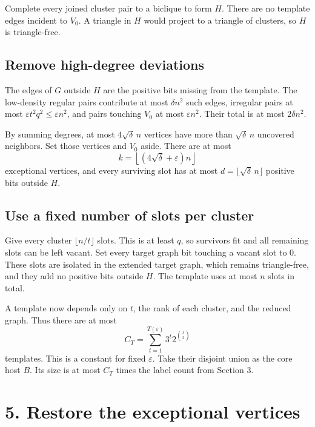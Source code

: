 \documentclass[11pt,a4paper]{article}
\begin{document}
Complete every joined cluster pair to a biclique to form \(H\). There
are no template edges incident to \(V_0\). A triangle in \(H\) would
project to a triangle of clusters, so \(H\) is triangle-free.

\subsection{Remove high-degree
deviations}\label{remove-high-degree-deviations}

The edges of \(G\) outside \(H\) are the positive bits missing from the
template. The low-density regular pairs contribute at most
\(\delta n^2\) such edges, irregular pairs at most
\(\varepsilon t^2q^2\le\varepsilon n^2\), and pairs touching \(V_0\) at
most \(\varepsilon n^2\). Their total is at most \(2\delta n^2\).

By summing degrees, at most \(4\sqrt\delta\,n\) vertices have more than
\(\sqrt\delta\,n\) uncovered neighbors. Set those vertices and \(V_0\)
aside. There are at most \[
k=\left\lfloor(4\sqrt\delta+\varepsilon)n\right\rfloor
\] exceptional vertices, and every surviving slot has at most
\(d=\lfloor\sqrt\delta\,n\rfloor\) positive bits outside \(H\).

\subsection{Use a fixed number of slots per
cluster}\label{use-a-fixed-number-of-slots-per-cluster}

Give every cluster \(\lfloor n/t\rfloor\) slots. This is at least \(q\),
so survivors fit and all remaining slots can be left vacant. Set every
target graph bit touching a vacant slot to \(0\). These slots are
isolated in the extended target graph, which remains triangle-free, and
they add no positive bits outside \(H\). The template uses at most \(n\)
slots in total.

A template now depends only on \(t\), the rank of each cluster, and the
reduced graph. Thus there are at most \[
C_T=\sum_{t=1}^{T(\varepsilon)}3^t2^{\binom t2}
\] templates. This is a constant for fixed \(\varepsilon\). Take their
disjoint union as the core host \(B\). Its size is at most \(C_T\) times
the label count from Section 3.

\newpage

\section{5. Restore the exceptional
vertices}\label{restore-the-exceptional-vertices}
\end{document}
